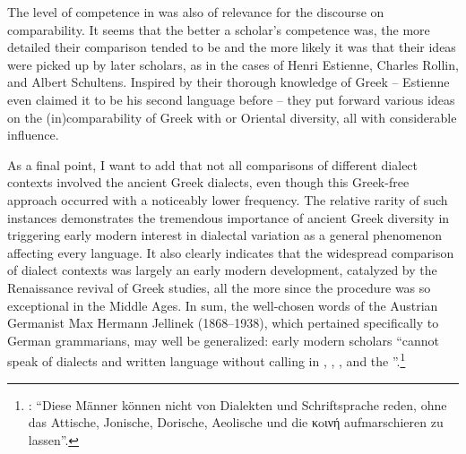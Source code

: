 The level of competence in  was also of relevance for the discourse on comparability. It seems that the better a scholar’s competence was, the more detailed their comparison tended to be and the more likely it was that their ideas were picked up by later scholars, as in the cases of Henri Estienne, Charles Rollin, and Albert Schultens. Inspired by their thorough knowledge of Greek – Estienne even claimed it to be his second language before  – they put forward various ideas on the (in)comparability of Greek with  or Oriental diversity, all with considerable influence.

As a final point, I want to add that not all comparisons of different dialect contexts involved the ancient Greek dialects, even though this Greek-free approach occurred with a noticeably lower frequency. The relative rarity of such instances demonstrates the tremendous importance of ancient Greek diversity in triggering early modern interest in dialectal variation as a general phenomenon affecting every language. It also clearly indicates that the widespread comparison of dialect contexts was largely an early modern development, catalyzed by the Renaissance revival of Greek studies, all the more since the procedure was so exceptional in the Middle Ages. In sum, the well-chosen words of the Austrian Germanist Max Hermann Jellinek (1868–1938), which pertained specifically to German grammarians, may well be generalized: early modern scholars “cannot speak of dialects and written language without calling in , , , and the ”.\footnote{\citet[21]{Jellinek1913}: “Diese Männer können nicht von Dialekten und Schriftsprache reden, ohne das Attische, Jonische, Dorische, Aeolische und die κoινή aufmarschieren zu lassen”.}

